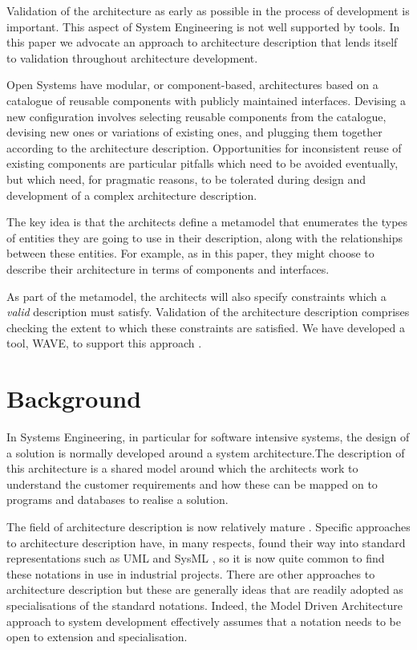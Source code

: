 \documentclass{llncs}
\begin{document}
Validation of the architecture as early as possible in the process of development is important. This aspect of System Engineering is not well supported by tools. In this paper we advocate an approach to architecture description that lends itself to validation throughout architecture development.

Open Systems have modular, or component-based, architectures based on a catalogue of reusable components with publicly maintained interfaces. Devising a new configuration involves selecting reusable components from the catalogue, devising new ones or variations of existing ones, and plugging them together according to the architecture description. Opportunities for inconsistent reuse of existing components are particular pitfalls which need to be avoided eventually, but which need, for pragmatic reasons, to be tolerated during design and development of a complex architecture description.

The key idea is that the architects define a metamodel that enumerates the types of entities they are going to use in their description, along with the relationships between these entities. For example, as in this paper, they might choose to describe their architecture in terms of components and interfaces. 

As part of the metamodel, the architects will also specify constraints which a {\em valid} description must satisfy. Validation of the architecture description comprises checking the extent to which these constraints are satisfied. We have developed a tool, WAVE, to support this approach \cite{Henderson4}.

\section{Background}
\label{sec:background}

\noindent In Systems Engineering, in particular for software intensive systems, the design of a solution is normally developed around a system architecture.The description of this architecture is a shared model around which the architects work to understand the customer requirements and how these can be mapped on to programs and databases to realise a solution. 

The field of architecture description is now relatively mature \cite{Kruchten,Shaw1,Maier,Henderson1,Henderson2,Rozanski,Shaw}. Specific approaches to architecture description have, in many respects, found their way into standard representations such as UML \cite{UML} and SysML \cite{SysML}, so it is now quite common to find these notations in use in industrial projects. There are other approaches to architecture description \cite{Holt,Hadar,Gokhale,Dekel,Egyed2,Nejati07matchingand,Balzer,Egyed1,Egyed3,Sabetzadeh07consistencychecking,Sabetzadeh_globalconsistency,Nuseibeh01makinginconsistency} but these are generally ideas that are readily adopted as specialisations of the standard notations. Indeed, the Model Driven Architecture approach to system development \cite{MDA} effectively assumes that a notation needs to be open to extension and specialisation.
\end{document}
